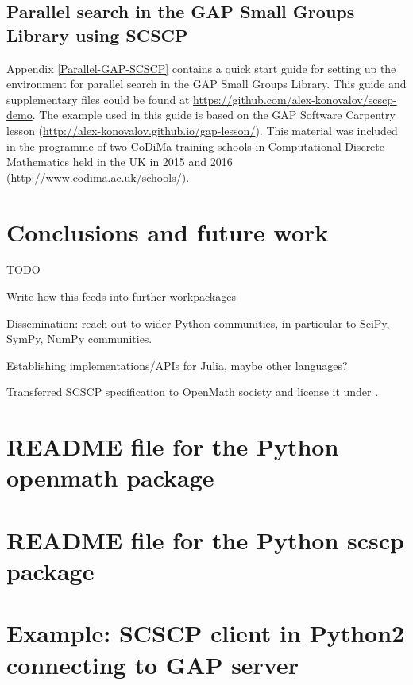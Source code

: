 \documentclass{deliverablereport}
\begin{document}
\subsection{Parallel search in the GAP Small Groups Library using SCSCP}

Appendix \ref{Parallel-GAP-SCSCP} contains a quick start guide for setting
up the environment for parallel search in the GAP Small Groups Library. This
guide and supplementary files could be found at
\url{https://github.com/alex-konovalov/scscp-demo}.
The example used in this guide is based on the GAP Software Carpentry
lesson (\url{http://alex-konovalov.github.io/gap-lesson/}). This material was
included in the programme of two CoDiMa training schools in Computational
Discrete Mathematics held in the UK in 2015 and 2016
(\url{http://www.codima.ac.uk/schools/}).


\section{Conclusions and future work}

TODO

Write how this feeds into further workpackages

Dissemination: reach out to wider Python communities,
in particular to SciPy, SymPy, NumPy communities.

Establishing implementations/APIs for Julia, maybe other languages?

Transferred SCSCP specification to OpenMath society and license it 
under .


\printbibliography

\newpage
\appendix

\section{README file for the Python openmath package}\label{py-openmath_README}


\section{README file for the Python scscp package}\label{py-scscp_README}


\section{Example: SCSCP client in Python2 connecting to GAP server}\label{python2-to-GAP}

\end{document}
